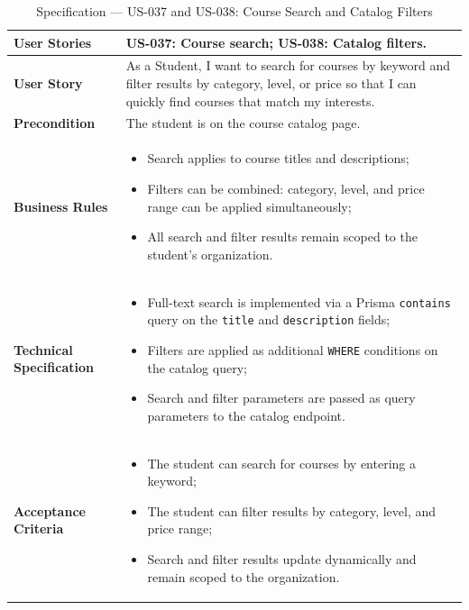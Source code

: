 \begin{table}[H]
\centering
\caption{Specification — US-037 and US-038: Course Search and Catalog Filters}
\label{tab:us037}
\renewcommand{\arraystretch}{1.2}
\begin{tabularx}{\textwidth}{|p{3.5cm}|X|}
\hline
\textbf{User Stories} & US-037: Course search; US-038: Catalog filters. \\
\hline
\textbf{User Story} & As a Student, I want to search for courses by keyword and filter results by category, level, or price so that I can quickly find courses that match my interests. \\
\hline
\textbf{Precondition} & The student is on the course catalog page. \\
\hline
\textbf{Business Rules} &
\begin{itemize}[noitemsep, topsep=2pt]
  \item Search applies to course titles and descriptions;
  \item Filters can be combined: category, level, and price range can be applied simultaneously;
  \item All search and filter results remain scoped to the student's organization.
\end{itemize} \\
\hline
\textbf{Technical Specification} &
\begin{itemize}[noitemsep, topsep=2pt]
  \item Full-text search is implemented via a Prisma \texttt{contains} query on the \texttt{title} and \texttt{description} fields;
  \item Filters are applied as additional \texttt{WHERE} conditions on the catalog query;
  \item Search and filter parameters are passed as query parameters to the catalog endpoint.
\end{itemize} \\
\hline
\textbf{Acceptance Criteria} &
\begin{itemize}[noitemsep, topsep=2pt]
  \item The student can search for courses by entering a keyword;
  \item The student can filter results by category, level, and price range;
  \item Search and filter results update dynamically and remain scoped to the organization.
\end{itemize} \\
\hline
\end{tabularx}
\end{table}


